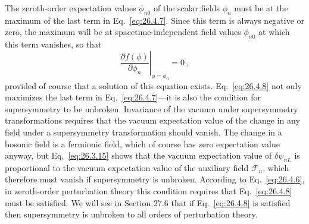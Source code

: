 The zeroth-order expectation values \(\phi_{n0}\) of the scalar fields
\(\phi_n\) must be at the maximum of the last term in Eq.~\eqref{eq:26.4.7}.
Since this term is always negative or zero, the maximum will be at
spacetime-independent field values \(\phi_{n0}\) at which this term vanishes,
so that
\begin{equation}
  \left.
  \frac{\partial f(\phi)}{\partial\phi_n}
  \right|_{\phi=\phi_0}=0\,,
  \tag{26.4.8}\label{eq:26.4.8}
\end{equation}
provided of course that a solution of this equation exists.
Eq.~\eqref{eq:26.4.8} not only maximizes the last term in
Eq.~\eqref{eq:26.4.7}---it is also the condition for supersymmetry to be
unbroken. Invariance of the vacuum under supersymmetry transformations
requires that the vacuum expectation value of the change in any field under a
supersymmetry transformation should vanish. The change in a bosonic field is
a fermionic field, which of course has zero expectation value anyway, but
Eq.~\eqref{eq:26.3.15} shows that the vacuum expectation value of
\(\delta\psi_{nL}\) is proportional to the vacuum expectation value of the
auxiliary field \(\mathcal{F}_n\), which therefore must vanish if
supersymmetry is unbroken. According to Eq.~\eqref{eq:26.4.6}, in zeroth-order
perturbation theory this condition requires that Eq.~\eqref{eq:26.4.8} must be
satisfied. We will see in Section 27.6 that if Eq.~\eqref{eq:26.4.8} is
satisfied then supersymmetry is unbroken to all orders of perturbation theory.

